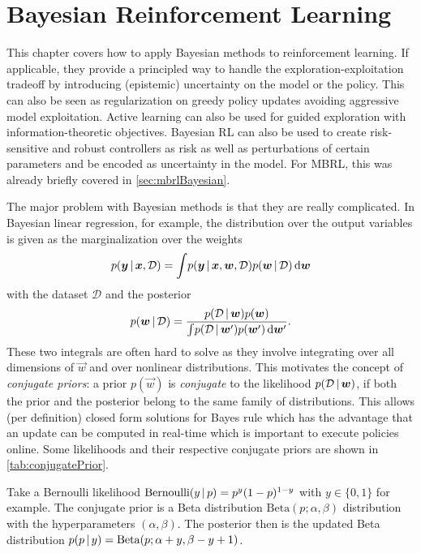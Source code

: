 \chapter{Bayesian Reinforcement Learning}
	This chapter covers how to apply Bayesian methods to reinforcement learning. If applicable, they provide a principled way to handle the exploration-exploitation tradeoff by introducing (epistemic) uncertainty on the model or the policy. This can also be seen as regularization on greedy policy updates avoiding aggressive model exploitation. Active learning can also be used for guided exploration with information-theoretic objectives. Bayesian RL can also be used to create risk-sensitive and robust controllers as risk as well as perturbations of certain parameters and be encoded as uncertainty in the model. For MBRL, this was already briefly covered in \autoref{sec:mbrlBayesian}.

	The major problem with Bayesian methods is that they are really complicated. In Bayesian linear regression, for example, the distribution over the output variables is given as the marginalization over the weights
	\begin{equation*}
		p(\bm{y} \,\vert\, \bm{x}, \mathcal{D}) = \int\! p(\bm{y} \,\vert\, \bm{x}, \bm{w}, \mathcal{D}) p(\bm{w} \,\vert\, \mathcal{D}) \dd{\bm{w}}
	\end{equation*}
	with the dataset \(\mathcal{D}\) and the posterior
	\begin{equation*}
		p(\bm{w} \,\vert\, \mathcal{D}) = \frac{p(\mathcal{D} \,\vert\, \bm{w}) p(\bm{w})}{\int\! p(\mathcal{D} \,\vert\, \bm{w}') p(\bm{w}') \dd{\bm{w}'}}.
	\end{equation*}
	These two integrals are often hard to solve as they involve integrating over all dimensions of \(\vec{w}\) and over nonlinear distributions. This motivates the concept of \emph{conjugate priors}: a prior \( p(\vec{w}) \) is \emph{conjugate} to the likelihood \( p(\mathcal{D} \,\vert\, \bm{w}) \), if both the prior and the posterior belong to the same family of distributions. This allows (per definition) closed form solutions for Bayes rule which has the advantage that an update can be computed in real-time which is important to execute policies online. Some likelihoods and their respective conjugate priors are shown in \autoref{tab:conjugatePrior}.

	Take a Bernoulli likelihood \( \mathrm{Bernoulli}(y \,\vert\, p) = p^y (1 - p)^{1 - y} \) with \( y \in \{ 0, 1 \} \) for example. The conjugate prior is a Beta distribution \( \mathrm{Beta}(p; \alpha, \beta) \) distribution with the hyperparameters \( (\alpha, \beta) \). The posterior then is the updated Beta distribution \( p(p \,\vert\, y) = \mathrm{Beta}(p; \alpha + y, \beta - y + 1) \).

